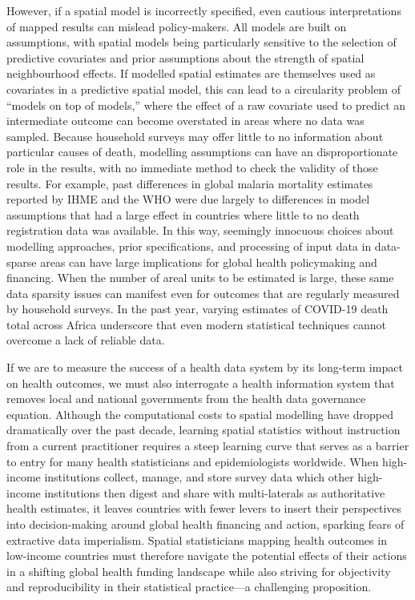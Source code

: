 \documentclass[
]{report}
\begin{document}
However, if a spatial model is incorrectly specified, even cautious interpretations of mapped results can mislead policy-makers. All models are built on assumptions, with spatial models being particularly sensitive to the selection of predictive covariates and prior assumptions about the strength of spatial neighbourhood effects. If modelled spatial estimates are themselves used as covariates in a predictive spatial model, this can lead to a circularity problem of ``models on top of models,'' where the effect of a raw covariate used to predict an intermediate outcome can become overstated in areas where no data was sampled. Because household surveys may offer little to no information about particular causes of death, modelling assumptions can have an disproportionate role in the results, with no immediate method to check the validity of those results. For example, past differences in global malaria mortality estimates reported by IHME and the WHO were due largely to differences in model assumptions that had a large effect in countries where little to no death registration data was available.\autocite{Tichenor2020} In this way, seemingly innocuous choices about modelling approaches, prior specifications, and processing of input data in data-sparse areas can have large implications for global health policymaking and financing. When the number of areal units to be estimated is large, these same data sparsity issues can manifest even for outcomes that are regularly measured by household surveys. In the past year, varying estimates of COVID-19 death total across Africa underscore that even modern statistical techniques cannot overcome a lack of reliable data.

If we are to measure the success of a health data system by its long-term impact on health outcomes, we must also interrogate a health information system that removes local and national governments from the health data governance equation. Although the computational costs to spatial modelling have dropped dramatically over the past decade, learning spatial statistics without instruction from a current practitioner requires a steep learning curve that serves as a barrier to entry for many health statisticians and epidemiologists worldwide. When high-income institutions collect, manage, and store survey data which other high-income institutions then digest and share with multi-laterals as authoritative health estimates, it leaves countries with fewer levers to insert their perspectives into decision-making around global health financing and action,\autocite{Cinnamon2020a} sparking fears of extractive data imperialism.\autocite{Marchais2020} Spatial statisticians mapping health outcomes in low-income countries must therefore navigate the potential effects of their actions in a shifting global health funding landscape while also striving for objectivity and reproducibility in their statistical practice---a challenging proposition.
\end{document}
